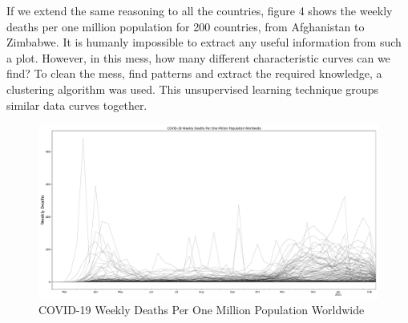 \documentclass[11pt,a4paper]{article}
\begin{document}
If we extend the same reasoning to all the countries, figure 4 shows the weekly
deaths per one million population for 200 countries, from Afghanistan to
Zimbabwe. It is humanly impossible to extract any useful information from such a
plot. However, in this mess, how many different characteristic curves can we
find? To clean the mess, find patterns and extract the required knowledge, a
clustering algorithm was used. This unsupervised learning technique groups
similar data curves together.
\begin{figure}[H]
    \begin{center}
        \hspace*{-0.3cm}
        \includegraphics[scale=0.32]{img/weekly-deaths-worldwide.pdf}
    \end{center}
    \caption{COVID-19 Weekly Deaths Per One Million Population Worldwide}
\end{figure}
\end{document}
